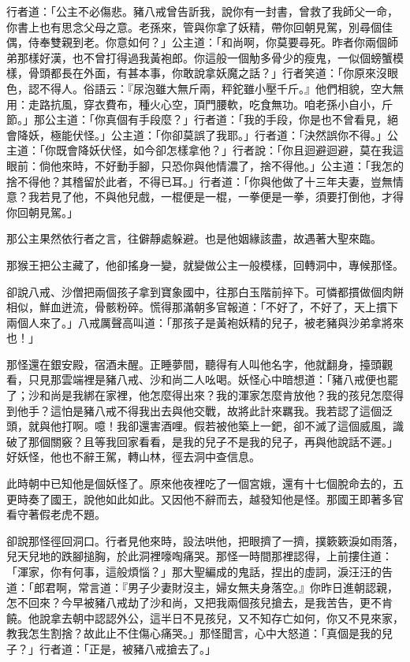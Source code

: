 行者道：「公主不必傷悲。豬八戒曾告訢我，說你有一封書，曾救了我師父一命，你書上也有思念父母之意。老孫來，管與你拿了妖精，帶你回朝見駕，別尋個佳偶，侍奉雙親到老。你意如何？」公主道：「和尚啊，你莫要尋死。昨者你兩個師弟那樣好漢，也不曾打得過我黃袍郎。你這般一個觔多骨少的瘦鬼，一似個螃蟹模樣，骨頭都長在外面，有甚本事，你敢說拿妖魔之話？」行者笑道：「你原來沒眼色，認不得人。俗語云：『尿泡雖大無斤兩，秤鉈雖小壓千斤。』他們相貌，空大無用：走路抗風，穿衣費布，種火心空，頂門腰軟，吃食無功。咱老孫小自小，斤節。」那公主道：「你真個有手段麼？」行者道：「我的手段，你是也不曾看見，絕會降妖，極能伏怪。」公主道：「你卻莫誤了我耶。」行者道：「決然誤你不得。」公主道：「你既會降妖伏怪，如今卻怎樣拿他？」行者說：「你且迴避迴避，莫在我這眼前：倘他來時，不好動手腳，只恐你與他情濃了，捨不得他。」公主道：「我怎的捨不得他？其稽留於此者，不得已耳。」行者道：「你與他做了十三年夫妻，豈無情意？我若見了他，不與他兒戲，一棍便是一棍，一拳便是一拳，須要打倒他，才得你回朝見駕。」

那公主果然依行者之言，往僻靜處躲避。也是他姻緣該盡，故遇著大聖來臨。

那猴王把公主藏了，他卻搖身一變，就變做公主一般模樣，回轉洞中，專候那怪。

卻說八戒、沙僧把兩個孩子拿到寶象國中，往那白玉階前捽下。可憐都摜做個肉餅相似，鮮血迸流，骨骸粉碎。慌得那滿朝多官報道：「不好了，不好了，天上摜下兩個人來了。」八戒厲聲高叫道：「那孩子是黃袍妖精的兒子，被老豬與沙弟拿將來也！」

那怪還在銀安殿，宿酒未醒。正睡夢間，聽得有人叫他名字，他就翻身，擡頭觀看，只見那雲端裡是豬八戒、沙和尚二人吆喝。妖怪心中暗想道：「豬八戒便也罷了；沙和尚是我綁在家裡，他怎麼得出來？我的渾家怎麼肯放他？我的孩兒怎麼得到他手？這怕是豬八戒不得我出去與他交戰，故將此計來羈我。我若認了這個泛頭，就與他打啊。噫！我卻還害酒哩。假若被他築上一鈀，卻不滅了這個威風，識破了那個關竅？且等我回家看看，是我的兒子不是我的兒子，再與他說話不遲。」好妖怪，他也不辭王駕，轉山林，徑去洞中查信息。

此時朝中已知他是個妖怪了。原來他夜裡吃了一個宮娥，還有十七個脫命去的，五更時奏了國王，說他如此如此。又因他不辭而去，越發知他是怪。那國王即著多官看守著假老虎不題。

卻說那怪徑回洞口。行者見他來時，設法哄他，把眼擠了一擠，撲簌簌淚如雨落，兒天兒地的跌腳搥胸，於此洞裡嚎啕痛哭。那怪一時間那裡認得，上前摟住道：「渾家，你有何事，這般煩惱？」那大聖編成的鬼話，捏出的虛詞，淚汪汪的告道：「郎君啊，常言道：『男子少妻財沒主，婦女無夫身落空。』你昨日進朝認親，怎不回來？今早被豬八戒劫了沙和尚，又把我兩個孩兒搶去，是我苦告，更不肯饒。他說拿去朝中認認外公，這半日不見孩兒，又不知存亡如何，你又不見來家，教我怎生割捨？故此止不住傷心痛哭。」那怪聞言，心中大怒道：「真個是我的兒子？」行者道：「正是，被豬八戒搶去了。」

